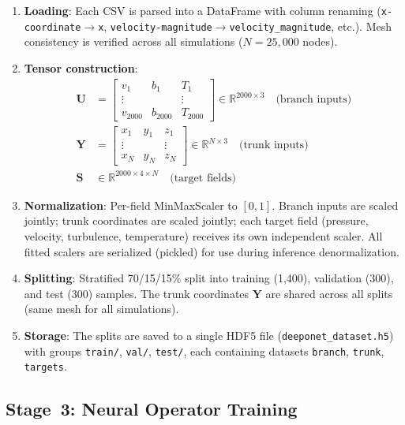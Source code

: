 \documentclass[conference]{IEEEtran}
\begin{document}
\begin{enumerate}
    \item \textbf{Loading}: Each CSV is parsed into a DataFrame with column renaming (\texttt{x-coordinate}$\to$\texttt{x}, \texttt{velocity-magnitude}$\to$\texttt{velocity\_magnitude}, etc.). Mesh consistency is verified across all simulations ($N = 25{,}000$ nodes).
   
    \item \textbf{Tensor construction}:
    \begin{align}
    \bm{U} &= \begin{bmatrix} v_1 & b_1 & T_1 \\ \vdots & & \vdots \\ v_{2000} & b_{2000} & T_{2000} \end{bmatrix} \in \mathbb{R}^{2000 \times 3} \quad\text{(branch inputs)} \\
    \bm{Y} &= \begin{bmatrix} x_1 & y_1 & z_1 \\ \vdots & & \vdots \\ x_N & y_N & z_N \end{bmatrix} \in \mathbb{R}^{N \times 3} \quad\text{(trunk inputs)} \\
    \bm{S} &\in \mathbb{R}^{2000 \times 4 \times N} \quad\text{(target fields)}
    \end{align}
   
    \item \textbf{Normalization}: Per-field MinMaxScaler to $[0,1]$. Branch inputs are scaled jointly; trunk coordinates are scaled jointly; each target field (pressure, velocity, turbulence, temperature) receives its own independent scaler. All fitted scalers are serialized (pickled) for use during inference denormalization.
   
    \item \textbf{Splitting}: Stratified 70/15/15\% split into training (1,400), validation (300), and test (300) samples. The trunk coordinates $\bm{Y}$ are shared across all splits (same mesh for all simulations).
   
    \item \textbf{Storage}: The splits are saved to a single HDF5 file (\texttt{deeponet\_dataset.h5}) with groups \texttt{train/}, \texttt{val/}, \texttt{test/}, each containing datasets \texttt{branch}, \texttt{trunk}, \texttt{targets}.
\end{enumerate}

\subsection{Stage~3: Neural Operator Training}
\end{document}

